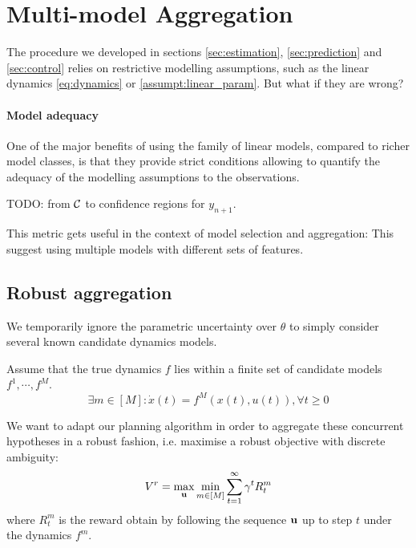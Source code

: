 \documentclass{article}
\begin{document}
\section{Multi-model Aggregation}

The procedure we developed in sections \ref{sec:estimation}, \ref{sec:prediction} and \ref{sec:control} relies on restrictive modelling assumptions, such as the linear dynamics \eqref{eq:dynamics} or \autoref{assumpt:linear_param}. But what if they are wrong?

\paragraph{Model adequacy}

One of the major benefits of using the family of linear models, compared to richer model classes, is that they provide strict conditions allowing to quantify the adequacy of the modelling assumptions to the observations.

TODO: from $\mathcal{C}$ to confidence regions for $y_{n+1}$.


This metric gets useful in the context of model selection and aggregation: 
This suggest using multiple models with different sets of features.

\subsection{Robust aggregation}

We temporarily ignore the parametric uncertainty over $\theta$ to simply consider several known candidate dynamics models.

\begin{assumption}
\label{assumpt:multi-model-ambiguity}
Assume that the true dynamics $f$ lies within a finite set of candidate models $f^1, \cdots, f^M$.
\begin{equation}
\exists m\in[M]: \dot{x}(t) = f^M(x(t), u(t)), \forall t\geq 0
\end{equation}
\end{assumption}
We want to adapt our planning algorithm in order to aggregate these concurrent hypotheses in a robust fashion, i.e. maximise a robust objective with discrete ambiguity:
\[
V^r = \max_{\mathbf{u}}\min_{m\in[M]} \sum_{t=1}^\infty \gamma^t R_t^m
\]
where $R_t^m$ is the reward obtain by following the sequence $\mathbf{u}$ up to step $t$ under the dynamics $f^m$.
\end{document}
